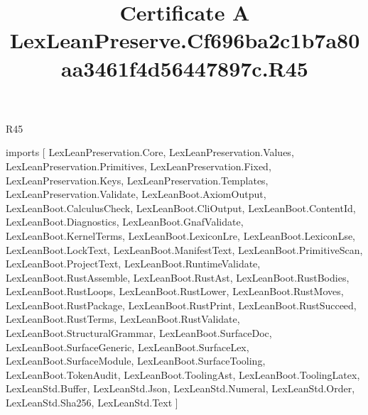 \begin{lexlean}{R45}
\title{Certificate A LexLeanPreserve.Cf696ba2c1b7a80aa3461f4d56447897c.R45}
\begin{coremodule}
imports [
  LexLeanPreservation.Core,
  LexLeanPreservation.Values,
  LexLeanPreservation.Primitives,
  LexLeanPreservation.Fixed,
  LexLeanPreservation.Keys,
  LexLeanPreservation.Templates,
  LexLeanPreservation.Validate,
  LexLeanBoot.AxiomOutput,
  LexLeanBoot.CalculusCheck,
  LexLeanBoot.CliOutput,
  LexLeanBoot.ContentId,
  LexLeanBoot.Diagnostics,
  LexLeanBoot.GnafValidate,
  LexLeanBoot.KernelTerms,
  LexLeanBoot.LexiconLre,
  LexLeanBoot.LexiconLse,
  LexLeanBoot.LockText,
  LexLeanBoot.ManifestText,
  LexLeanBoot.PrimitiveScan,
  LexLeanBoot.ProjectText,
  LexLeanBoot.RuntimeValidate,
  LexLeanBoot.RustAssemble,
  LexLeanBoot.RustAst,
  LexLeanBoot.RustBodies,
  LexLeanBoot.RustLoops,
  LexLeanBoot.RustLower,
  LexLeanBoot.RustMoves,
  LexLeanBoot.RustPackage,
  LexLeanBoot.RustPrint,
  LexLeanBoot.RustSucceed,
  LexLeanBoot.RustTerms,
  LexLeanBoot.RustValidate,
  LexLeanBoot.StructuralGrammar,
  LexLeanBoot.SurfaceDoc,
  LexLeanBoot.SurfaceGeneric,
  LexLeanBoot.SurfaceLex,
  LexLeanBoot.SurfaceModule,
  LexLeanBoot.SurfaceTooling,
  LexLeanBoot.TokenAudit,
  LexLeanBoot.ToolingAst,
  LexLeanBoot.ToolingLatex,
  LexLeanStd.Buffer,
  LexLeanStd.Json,
  LexLeanStd.Numeral,
  LexLeanStd.Order,
  LexLeanStd.Sha256,
  LexLeanStd.Text
]


\end{coremodule}
\end{lexlean}
